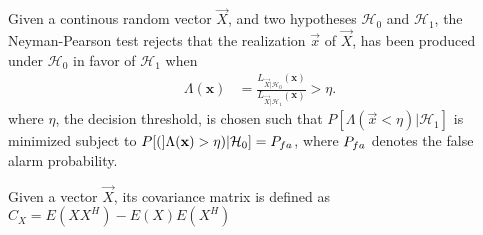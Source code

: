 \documentclass[a4paper, openany, oneside]{memoir}
\begin{document}
\begin{blockDefinition}
Given a continous random vector $\vec{X}$, and two hypotheses $\mathcal{H}_0$ and $\mathcal{H}_1$, the Neyman-Pearson test rejects that the realization $\vec{x}$ of $\vec{X}$, has been produced under $\mathcal{H}_0$ in favor of $\mathcal{H}_1$
when
\begin{align*}
    \Lambda (\mathbf{x}) &= \frac{L_{\vec{X} | \mathcal{H}_0} (\mathbf{x})}{L_{\vec{X} | \mathcal{H}_1}(\mathbf{x})} > \eta.
\end{align*}
where $\eta$, the decision threshold, is chosen such that $P[\Lambda(\vec{x} < \eta) | \mathcal{H}_1]$ is minimized subject to $P[(]\Lambda(\vec{x}) > \eta) | \mathcal{H}_0] = P\ss{fa}$, where $P\ss{fa}$ denotes the false alarm probability. %
\end{blockDefinition}

\begin{blockDefinition}
Given a vector $\vec{X}$, its covariance matrix is defined as $C_{X} = E(XX^H)-E(X)E(X^H)$
\end{blockDefinition}
\end{document}
